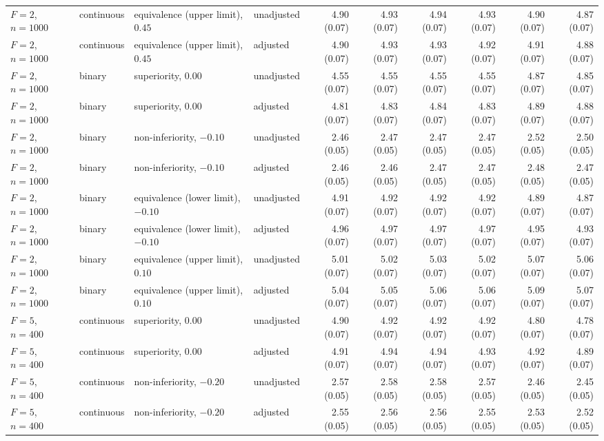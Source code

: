 \documentclass[12pt,a4paper]{article}
\theoremstyle{definition}
\theoremstyle{remark}\newtheorem{remark}{Remark}
\numberwithin{equation}{section}
\begin{document}
\begin{landscape}
\begin{singlespace}
\begin{longtable}{@{}llllrrrrrr@{}}
$F=2$, $n=1000$ & continuous & equivalence (upper limit), $0.45$ & unadjusted & 4.90 (0.07) & 4.93 (0.07) & 4.94 (0.07) & 4.93 (0.07) & 4.90 (0.07) & 4.87 (0.07)\\
$F=2$, $n=1000$ & continuous & equivalence (upper limit), $0.45$ & adjusted & 4.90 (0.07) & 4.93 (0.07) & 4.93 (0.07) & 4.92 (0.07) & 4.91 (0.07) & 4.88 (0.07)\\
$F=2$, $n=1000$ & binary & superiority, $0.00$ & unadjusted & 4.55 (0.07) & 4.55 (0.07) & 4.55 (0.07) & 4.55 (0.07) & 4.87 (0.07) & 4.85 (0.07)\\
$F=2$, $n=1000$ & binary & superiority, $0.00$ & adjusted & 4.81 (0.07) & 4.83 (0.07) & 4.84 (0.07) & 4.83 (0.07) & 4.89 (0.07) & 4.88 (0.07)\\
$F=2$, $n=1000$ & binary & non-inferiority, $-0.10$ & unadjusted & 2.46 (0.05) & 2.47 (0.05) & 2.47 (0.05) & 2.47 (0.05) & 2.52 (0.05) & 2.50 (0.05)\\
$F=2$, $n=1000$ & binary & non-inferiority, $-0.10$ & adjusted & 2.46 (0.05) & 2.46 (0.05) & 2.47 (0.05) & 2.47 (0.05) & 2.48 (0.05) & 2.47 (0.05)\\
$F=2$, $n=1000$ & binary & equivalence (lower limit), $-0.10$ & unadjusted & 4.91 (0.07) & 4.92 (0.07) & 4.92 (0.07) & 4.92 (0.07) & 4.89 (0.07) & 4.87 (0.07)\\
$F=2$, $n=1000$ & binary & equivalence (lower limit), $-0.10$ & adjusted & 4.96 (0.07) & 4.97 (0.07) & 4.97 (0.07) & 4.97 (0.07) & 4.95 (0.07) & 4.93 (0.07)\\
$F=2$, $n=1000$ & binary & equivalence (upper limit), $0.10$ & unadjusted & 5.01 (0.07) & 5.02 (0.07) & 5.03 (0.07) & 5.02 (0.07) & 5.07 (0.07) & 5.06 (0.07)\\
$F=2$, $n=1000$ & binary & equivalence (upper limit), $0.10$ & adjusted & 5.04 (0.07) & 5.05 (0.07) & 5.06 (0.07) & 5.06 (0.07) & 5.09 (0.07) & 5.07 (0.07)\\
$F=5$, $n=400$ & continuous & superiority, $0.00$ & unadjusted & 4.90 (0.07) & 4.92 (0.07) & 4.92 (0.07) & 4.92 (0.07) & 4.80 (0.07) & 4.78 (0.07)\\
$F=5$, $n=400$ & continuous & superiority, $0.00$ & adjusted & 4.91 (0.07) & 4.94 (0.07) & 4.94 (0.07) & 4.93 (0.07) & 4.92 (0.07) & 4.89 (0.07)\\
$F=5$, $n=400$ & continuous & non-inferiority, $-0.20$ & unadjusted & 2.57 (0.05) & 2.58 (0.05) & 2.58 (0.05) & 2.57 (0.05) & 2.46 (0.05) & 2.45 (0.05)\\
$F=5$, $n=400$ & continuous & non-inferiority, $-0.20$ & adjusted & 2.55 (0.05) & 2.56 (0.05) & 2.56 (0.05) & 2.55 (0.05) & 2.53 (0.05) & 2.52 (0.05)\\

\end{longtable}
\end{singlespace}
\end{landscape}
\end{document}
